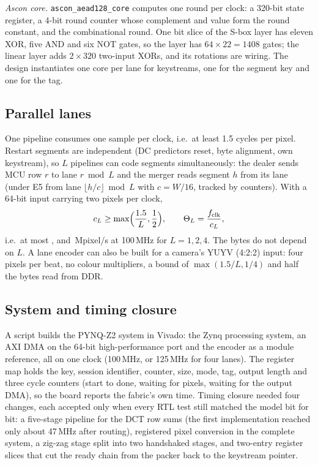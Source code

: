 \textit{Ascon core.} \texttt{ascon\_aead128\_core} computes one round per clock: a 320-bit state register, a 4-bit round counter whose complement and value form the round constant, and the combinational round. One bit slice of the S-box layer has eleven XOR, five AND and six NOT gates, so the layer has $64 \times 22 = 1408$ gates; the linear layer adds $2 \times 320$ two-input XORs, and its rotations are wiring. The design instantiates one core per lane for keystreams, one for the segment key and one for the tag.

\subsection{Parallel lanes}\label{sec:lanes}
One pipeline consumes one sample per clock, i.e.\ at least 1.5 cycles per pixel. Restart segments are independent (DC predictors reset, byte alignment, own keystream), so $L$ pipelines can code segments simultaneously: the dealer sends MCU row $r$ to lane $r \bmod L$ and the merger reads segment $h$ from its lane (under E5 from lane $\lfloor h/c \rfloor \bmod L$ with $c = W/16$, tracked by counters). With a 64-bit input carrying two pixels per clock,
\begin{equation}
c_L \ge \max\Bigl(\frac{1.5}{L}, \frac{1}{2}\Bigr), \qquad \Theta_L = \frac{f_{\mathrm{clk}}}{c_L},
\label{eq:lanes}
\end{equation}
i.e.\ at most \BoundOneMpix, \BoundTwoMpix{} and \BoundFourMpix\,Mpixel/s at 100\,MHz for $L = 1, 2, 4$. The bytes do not depend on $L$. A lane encoder can also be built for a camera's YUYV (4:2:2) input: four pixels per beat, no colour multipliers, a bound of $\max(1.5/L, 1/4)$ and half the bytes read from DDR.

\subsection{System and timing closure}\label{sec:zynq}
A script builds the PYNQ-Z2 system in Vivado: the Zynq processing system, an AXI DMA on the 64-bit high-performance port and the encoder as a module reference, all on one clock (100\,MHz, or 125\,MHz for four lanes). The register map holds the key, session identifier, counter, size, mode, tag, output length and three cycle counters (start to done, waiting for pixels, waiting for the output DMA), so the board reports the fabric's own time. Timing closure needed four changes, each accepted only when every RTL test still matched the model bit for bit: a five-stage pipeline for the DCT row sums (the first implementation reached only about 47\,MHz after routing), registered pixel conversion in the complete system, a zig-zag stage split into two handshaked stages, and two-entry register slices that cut the ready chain from the packer back to the keystream pointer.
